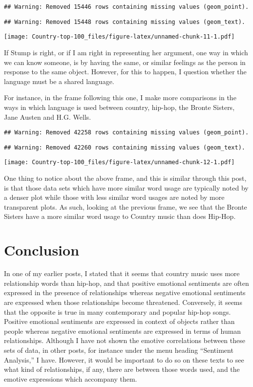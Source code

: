 \documentclass[]{article}
\begin{document}
\begin{verbatim}
## Warning: Removed 15446 rows containing missing values (geom_point).
\end{verbatim}

\begin{verbatim}
## Warning: Removed 15448 rows containing missing values (geom_text).
\end{verbatim}

\texttt{[image: Country-top-100\_files/figure-latex/unnamed-chunk-11-1.pdf]}

If Stump is right, or if I am right in representing her argument, one
way in which we can know someone, is by having the same, or similar
feelings as the person in response to the same object. However, for this
to happen, I question whether the language must be a shared language.

For instance, in the frame following this one, I make more comparisons
in the ways in which language is used between country, hip-hop, the
Bronte Sisters, Jane Austen and H.G. Wells.

\begin{verbatim}
## Warning: Removed 42258 rows containing missing values (geom_point).
\end{verbatim}

\begin{verbatim}
## Warning: Removed 42260 rows containing missing values (geom_text).
\end{verbatim}

\texttt{[image: Country-top-100\_files/figure-latex/unnamed-chunk-12-1.pdf]}

One thing to notice about the above frame, and this is similar through
this post, is that those data sets which have more similar word usage
are typically noted by a denser plot while those with less similar word
usages are noted by more transparent plots. As such, looking at the
previous frame, we see that the Bronte Sisters have a more similar word
usage to Country music than does Hip-Hop.

\hypertarget{conclusion}{%
\section{Conclusion}\label{conclusion}}

In one of my earlier posts, I stated that it seems that country music
uses more relationship words than hip-hop, and that positive emotional
sentiments are often expressed in the presence of relationships whereas
negative emotional sentiments are expressed when those relationships
become threatened. Conversely, it seems that the opposite is true in
many contemporary and popular hip-hop songs. Positive emotional
sentiments are expressed in context of objects rather than people
whereas negative emotional sentiments are expressed in terms of human
relationships. Although I have not shown the emotive correlations
between these sets of data, in other posts, for instance under the menu
heading ``Sentiment Analysis,'' I have. However, it would be important
to do so on these texts to see what kind of relationships, if any, there
are between those words used, and the emotive expressions which
accompany them.
\end{document}
